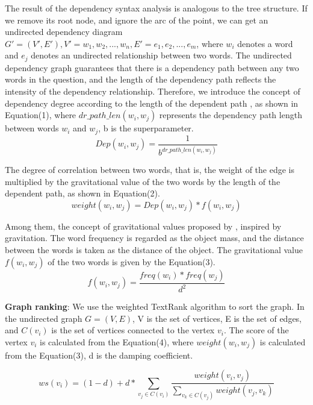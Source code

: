 \documentclass[11pt,a4paper]{article}
\begin{document}
The result of the dependency syntax analysis is analogous to the tree structure. If we remove its root node, and ignore the arc of the point, we can get an undirected dependency diagram $G'=(V', E'), V'=w_{1}, w_{2}, ..., w_{n}, E'=e_{1}, e_{2}, ..., e_{m}$, where $w_{i}$ denotes a word and $e_{j}$ denotes an undirected relationship between two words. The undirected dependency graph guarantees that there is a dependency path between any two words in the question, and the length of the dependency path reflects the intensity of the dependency relationship. Therefore, we introduce the concept of dependency degree according to the length of the dependent path \cite{zhang2012use}, as shown in Equation(1), where  $dr\_path\_len(w_{i}, w_{j})$ represents the dependency path length between words $w_{i}$ and $w_{j}$, b is the superparameter.
\begin{equation}Dep(w_{i},w_{j})=\frac{1}{b^{dr\_path\_len(w_{i},w_{j})}}\end{equation}

The degree of correlation between two words, that is, the weight of the edge is multiplied by the gravitational value of the two words by the length of the dependent path, as shown in Equation(2).
\begin{equation}weight(w_{i},w_{j})=Dep(w_{i},w_{j})*f(w_{i},w_{j})\end{equation}

Among them, the concept of gravitational values proposed by \cite{Wang2015CorpusindependentGK}, inspired by gravitation. The word frequency is regarded as the object mass, and the distance between the words is taken as the distance of the object. The gravitational value $f(w_{i}, w_{j})$ of the two words is given by the Equation(3).
\begin{equation}f(w_{i},w_{j})=\frac{freq(w_{i})*freq(w_{j})}{d^{2}}\end{equation}

{\bf Graph ranking}: We use the weighted TextRank algorithm to sort the graph. In the undirected graph $G=(V, E)$, V is the set of vertices, E is the set of edges, and $C(v_{i})$ is the set of vertices connected to the vertex $v_{i}$. The score of the vertex  $v_{i}$ is calculated from the Equation(4), where $weight(w_{i}, w_{j})$ is calculated from the Equation(3), d is the damping coefficient.

\begin{equation}
ws(v_{i})=(1-d)+d*\sum_{v_{j}\in C(v_{i})}\frac{weight(v_{i},v_{j})}{\sum_{v_{k}\in C(v_{j})}weight(v_{j},v_{k})}\end{equation}
\end{document}
